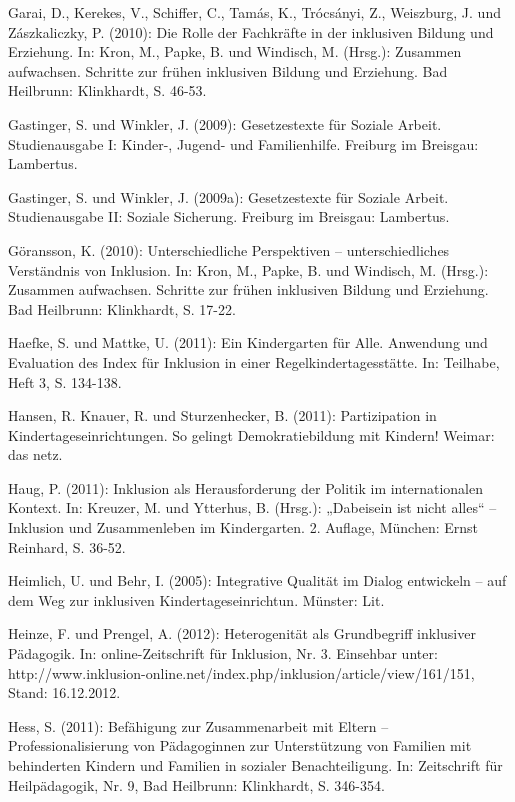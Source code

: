 Garai, D., Kerekes, V., Schiffer, C., Tamás,
K., Trócsányi, Z., Weiszburg, J. und Zászkaliczky, P. (2010):
Die Rolle der Fachkräfte in der inklusiven Bildung und
Erziehung. In: Kron, M., Papke, B. und Windisch, M. (Hrsg.): Zusammen aufwachsen. Schritte zur frühen inklusiven Bildung und Erziehung. Bad Heilbrunn: Klinkhardt, S. 46-53.

Gastinger, S. und Winkler, J. (2009): Gesetzestexte für Soziale Arbeit. Studienausgabe I: Kinder-, Jugend- und Familienhilfe. Freiburg im Breisgau: Lambertus.

Gastinger, S. und Winkler, J. (2009a): Gesetzestexte für Soziale Arbeit. Studienausgabe II: Soziale Sicherung. Freiburg im Breisgau: Lambertus.

Göransson, K. (2010): Unterschiedliche Perspektiven – unterschiedliches Verständnis von Inklusion. In: Kron, M., Papke, B. und Windisch, M. (Hrsg.): Zusammen aufwachsen. Schritte zur frühen inklusiven Bildung und Erziehung. Bad Heilbrunn: Klinkhardt, S. 17-22. 

Haefke, S. und Mattke, U. (2011): Ein Kindergarten für Alle. Anwendung und Evaluation des Index für Inklusion in einer Regelkindertagesstätte. In: Teilhabe, Heft 3, S. 134-138.

Hansen, R. Knauer, R. und Sturzenhecker, B. (2011): Partizipation in Kindertageseinrichtungen. So gelingt Demokratiebildung mit Kindern! Weimar: das netz.

Haug, P. (2011): Inklusion als Herausforderung der Politik im internationalen Kontext. In: Kreuzer, M. und Ytterhus, B. (Hrsg.): „Dabeisein ist nicht alles“ -- Inklusion und Zusammenleben im Kindergarten. 2. Auflage, München: Ernst Reinhard, S. 36-52.   

Heimlich, U. und Behr, I. (2005): Integrative Qualität im Dialog entwickeln – auf dem Weg zur inklusiven Kindertageseinrichtun. Münster: Lit. 

Heinze, F. und Prengel, A. (2012): Heterogenität als Grundbegriff inklusiver Pädagogik. In: online-Zeitschrift für Inklusion, Nr. 3. Einsehbar unter: http://www.inklusion-online.net/index.php/inklusion/article/view/161/151, Stand: 16.12.2012.


Hess, S. (2011): Befähigung zur Zusammenarbeit mit Eltern -- Professionalisierung von Pädagoginnen zur Unterstützung von Familien mit behinderten Kindern und Familien in sozialer Benachteiligung. In: Zeitschrift für Heilpädagogik, Nr. 9, Bad Heilbrunn: Klinkhardt, S. 346-354.  


